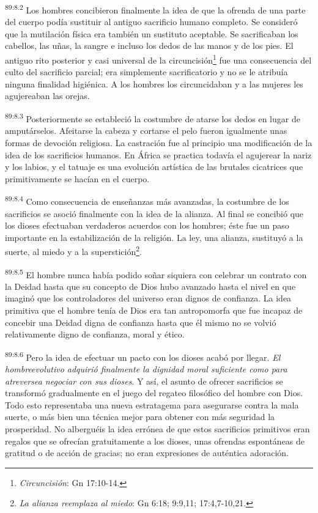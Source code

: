 \documentclass[twoside, 11pt]{book}
\begin{document}
\par
\textsuperscript{89:8.2} Los hombres concibieron finalmente la idea de que la ofrenda de una parte del cuerpo podía sustituir al antiguo sacrificio humano completo. Se consideró que la mutilación física era también un sustituto aceptable. Se sacrificaban los cabellos, las uñas, la sangre e incluso los dedos de las manos y de los pies. El antiguo rito posterior y casi universal de la circuncisión\footnote{\textit{Circuncisión}: Gn 17:10-14.} fue una consecuencia del culto del sacrificio parcial; era simplemente sacrificatorio y no se le atribuía ninguna finalidad higiénica. A los hombres los circuncidaban y a las mujeres les agujereaban las orejas.

\par
\textsuperscript{89:8.3} Posteriormente se estableció la costumbre de atarse los dedos en lugar de amputárselos. Afeitarse la cabeza y cortarse el pelo fueron igualmente unas formas de devoción religiosa. La castración fue al principio una modificación de la idea de los sacrificios humanos. En África se practica todavía el agujerear la nariz y los labios, y el tatuaje es una evolución artística de las brutales cicatrices que primitivamente se hacían en el cuerpo.

\par
\textsuperscript{89:8.4} Como consecuencia de enseñanzas más avanzadas, la costumbre de los sacrificios se asoció finalmente con la idea de la alianza. Al final se concibió que los dioses efectuaban verdaderos acuerdos con los hombres; éste fue un paso importante en la estabilización de la religión. La ley, una alianza, sustituyó a la suerte, al miedo y a la superstición\footnote{\textit{La alianza reemplaza al miedo}: Gn 6:18; 9:9,11; 17:4,7-10,21.}.

\par
\textsuperscript{89:8.5} El hombre nunca había podido soñar siquiera con celebrar un contrato con la Deidad hasta que su concepto de Dios hubo avanzado hasta el nivel en que imaginó que los controladores del universo eran dignos de confianza. La idea primitiva que el hombre tenía de Dios era tan antropomorfa que fue incapaz de concebir una Deidad digna de confianza hasta que él mismo no se volvió relativamente digno de confianza, moral y ético.

\par
\textsuperscript{89:8.6} Pero la idea de efectuar un pacto con los dioses acabó por llegar. \textit{El hombreevolutivo adquirió finalmente la dignidad moral suficiente como para atreversea negociar con sus dioses}. Y así, el asunto de ofrecer sacrificios se transformó gradualmente en el juego del regateo filosófico del hombre con Dios. Todo esto representaba una nueva estratagema para asegurarse contra la mala suerte, o más bien una técnica mejor para obtener con más seguridad la prosperidad. No alberguéis la idea errónea de que estos sacrificios primitivos eran regalos que se ofrecían gratuitamente a los dioses, unas ofrendas espontáneas de gratitud o de acción de gracias; no eran expresiones de auténtica adoración.
\end{document}
